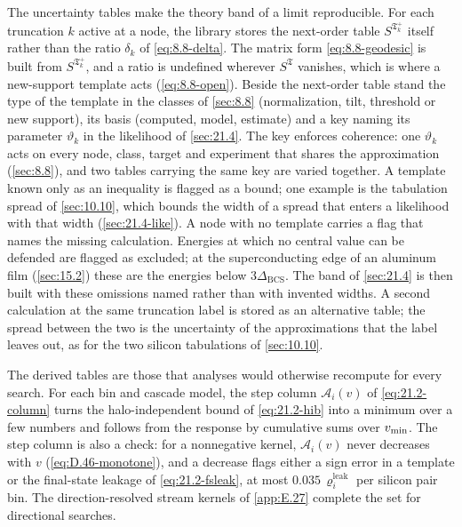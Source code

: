 The uncertainty tables make the theory band of a limit reproducible. For each truncation $k$ active at a node, the library stores the next-order table $S^{\mathfrak{T}_k^+}$ itself rather than the ratio $\delta_k$ of \cref{eq:8.8-delta}. The matrix form \cref{eq:8.8-geodesic} is built from $S^{\mathfrak{T}_k^+}$, and a ratio is undefined wherever $S^{\mathfrak{T}}$ vanishes, which is where a new-support template acts (\cref{eq:8.8-open}). Beside the next-order table stand the type of the template in the classes of \cref{sec:8.8} (normalization, tilt, threshold or new support), its basis (computed, model, estimate) and a key naming its parameter $\vartheta_k$ in the likelihood of \cref{sec:21.4}. The key enforces coherence: one $\vartheta_k$ acts on every node, class, target and experiment that shares the approximation (\cref{sec:8.8}), and two tables carrying the same key are varied together. A template known only as an inequality is flagged as a bound; one example is the tabulation spread of \cref{sec:10.10}, which bounds the width of a spread that enters a likelihood with that width (\cref{sec:21.4-like}). A node with no template carries a flag that names the missing calculation. Energies at which no central value can be defended are flagged as excluded; at the superconducting edge of an aluminum film (\cref{sec:15.2}) these are the energies below $3\Delta_{\mathrm{BCS}}$. The band of \cref{sec:21.4} is then built with these omissions named rather than with invented widths. A second calculation at the same truncation label is stored as an alternative table; the spread between the two is the uncertainty of the approximations that the label leaves out, as for the two silicon tabulations of \cref{sec:10.10}.

The derived tables are those that analyses would otherwise recompute for every search. For each bin and cascade model, the step column $\mathcal{A}_i(v)$ of \cref{eq:21.2-column} turns the halo-independent bound of \cref{eq:21.2-hib} into a minimum over a few numbers and follows from the response by cumulative sums over $v_{\mathrm{min}}$. The step column is also a check: for a nonnegative kernel, $\mathcal{A}_i(v)$ never decreases with $v$ (\cref{eq:D.46-monotone}), and a decrease flags either a sign error in a template or the final-state leakage of \cref{eq:21.2-fsleak}, at most $0.035\,\varrho^{\mathrm{leak}}_i$ per silicon pair bin. The direction-resolved stream kernels of \cref{app:E.27} complete the set for directional searches.


